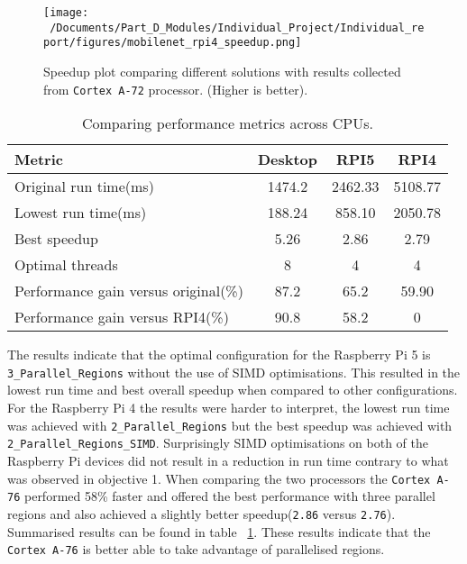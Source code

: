\begin{figure}[htbp] %
	\centering
	\texttt{[image: ~/Documents/Part\_D\_Modules/Individual\_Project/Individual\_report/figures/mobilenet\_rpi4\_speedup.png]} %
	\caption{Speedup plot comparing different solutions with results collected from \texttt{Cortex A-72} processor. (Higher is better).}
	\label{fig:mobilenet_rpi4_speedup} %
\end{figure}

\begin{table}[htbp]
	\centering
	\begin{tabular}{@{}lccc@{}}
		\toprule
		\textbf{Metric} & \textbf{Desktop} & \textbf{RPI5} & \textbf{RPI4} \\ \midrule
		Original run time(ms)&1474.2&2462.33 &5108.77 \\
		Lowest run time(ms)&188.24 &858.10 &2050.78 \\
		Best speedup&5.26 &2.86 &2.79 \\
		Optimal threads&8 &4 & 4\\
		Performance gain versus original(\%)&87.2&65.2 & 59.90\\
		Performance gain versus RPI4(\%)&90.8 &58.2 &0 \\
		\bottomrule
	\end{tabular}
	\caption{Comparing performance metrics across CPUs.}
	\label{tab:performance_comparison}
\end{table}

The results indicate that the optimal configuration for the Raspberry Pi 5 is \texttt{3\_Parallel\_Regions} without the use of SIMD optimisations. This resulted in the lowest run time and best overall speedup when compared to other configurations. For the Raspberry Pi 4 the results were harder to interpret, the lowest run time was achieved with \texttt{2\_Parallel\_Regions} but the best speedup was achieved with \texttt{2\_Parallel\_Regions\_SIMD}. Surprisingly SIMD optimisations on both of the Raspberry Pi devices did not result in a reduction in run time contrary to what was observed in objective 1. When comparing the two processors the \texttt{Cortex A-76} performed 58\% faster and offered the best performance with three parallel regions and also achieved a slightly better speedup(\texttt{2.86} versus \texttt{2.76}). Summarised results can be found in table ~\ref{tab:performance_comparison}. These results indicate that the \texttt{Cortex A-76} is better able to take advantage of parallelised regions. 


